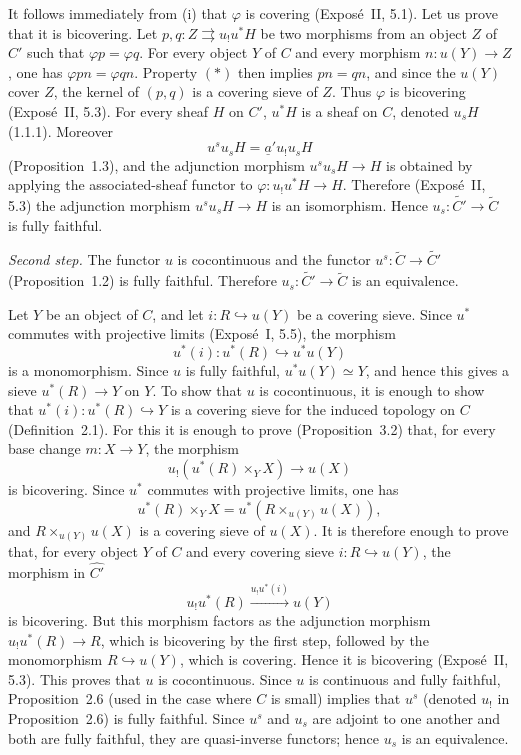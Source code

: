 \documentclass[11pt]{article}
\begin{document}
It follows immediately from (i) that \(\varphi\) is covering (Expos\'e~II, 5.1). Let us prove that it is bicov\-ering. Let \(p,q:Z\rightrightarrows u_!u^{\ast}H\) be two morphisms from an object \(Z\) of \(C'\) such that \(\varphi p=\varphi q\). For every object \(Y\) of \(C\) and every morphism \(n:u(Y)\to Z\), one has \(\varphi pn=\varphi qn\). Property \((*)\) then implies \(pn=qn\), and since the \(u(Y)\) cover \(Z\), the kernel of \((p,q)\) is a covering sieve of \(Z\). Thus \(\varphi\) is bicov\-ering (Expos\'e~II, 5.3). For every sheaf \(H\) on \(C'\), \(u^{\ast}H\) is a sheaf on \(C\), denoted \(u_sH\) (1.1.1). Moreover
\[
u^su_sH=\underline a'u_!u_sH
\]
(Proposition~1.3), and the adjunction morphism \(u^su_sH\to H\) is obtained by applying the associated-sheaf functor to \(\varphi:u_!u^{\ast}H\to H\). Therefore (Expos\'e~II, 5.3) the adjunction morphism \(u^su_sH\to H\) is an isomorphism. Hence \(u_s:\widetilde{C'}\to\widetilde C\) is fully faithful.

\emph{Second step.} The functor \(u\) is cocontinuous and the functor \(u^s:\widetilde C\to\widetilde{C'}\) (Proposition~1.2) is fully faithful. Therefore \(u_s:\widetilde{C'}\to\widetilde C\) is an equivalence.

Let \(Y\) be an object of \(C\), and let \(i:R\hookrightarrow u(Y)\) be a covering sieve. Since \(u^{\ast}\) commutes with projective limits (Expos\'e~I, 5.5), the morphism
\[
u^{\ast}(i):u^{\ast}(R)\hookrightarrow u^{\ast}u(Y)
\]
is a monomorphism. Since \(u\) is fully faithful, \(u^{\ast}u(Y)\simeq Y\), and hence this gives a sieve \(u^{\ast}(R)\to Y\) on \(Y\). To show that \(u\) is cocontinuous, it is enough to show that \(u^{\ast}(i):u^{\ast}(R)\hookrightarrow Y\) is a covering sieve for the induced topology on \(C\) (Definition~2.1). For this it is enough to prove (Proposition~3.2) that, for every base change \(m:X\to Y\), the morphism
\[
u_!(u^{\ast}(R)\times_YX)\to u(X)
\]
is bicov\-ering. Since \(u^{\ast}\) commutes with projective limits, one has
\[
u^{\ast}(R)\times_YX=u^{\ast}(R\times_{u(Y)}u(X)),
\]
and \(R\times_{u(Y)}u(X)\) is a covering sieve of \(u(X)\). It is therefore enough to prove that, for every object \(Y\) of \(C\) and every covering sieve \(i:R\hookrightarrow u(Y)\), the morphism in \(\widehat{C'}\)
\[
u_!u^{\ast}(R)\xrightarrow{u_!u^{\ast}(i)}u(Y)
\]
is bicov\-ering. But this morphism factors as the adjunction morphism \(u_!u^{\ast}(R)\to R\), which is bicov\-ering by the first step, followed by the monomorphism \(R\hookrightarrow u(Y)\), which is covering. Hence it is bicov\-ering (Expos\'e~II, 5.3). This proves that \(u\) is cocontinuous. Since \(u\) is continuous and fully faithful, Proposition~2.6 (used in the case where \(C\) is small) implies that \(u^s\) (denoted \(u_!\) in Proposition~2.6) is fully faithful. Since \(u^s\) and \(u_s\) are adjoint to one another and both are fully faithful, they are quasi-inverse functors; hence \(u_s\) is an equivalence.
\end{document}
